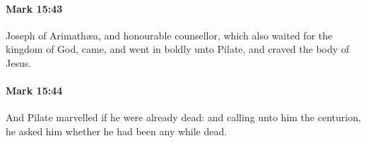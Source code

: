		\paragraph{Mark 15:43} %
			\label{MARK-15-43}

			Joseph of Arimathæa, and honourable counsellor, which also waited for the kingdom of God, came, and went in boldly unto Pilate, and craved the body of Jesus.

			\begin{framed}
			\scriptsize
				\begin{compactdesc}
					\item[SBLG] 
				\end{compactdesc}
			\end{framed}

		\paragraph{Mark 15:44} %
			\label{MARK-15-44}

			And Pilate marvelled if he were already dead: and calling unto him the centurion, he asked him whether he had been any while dead.

